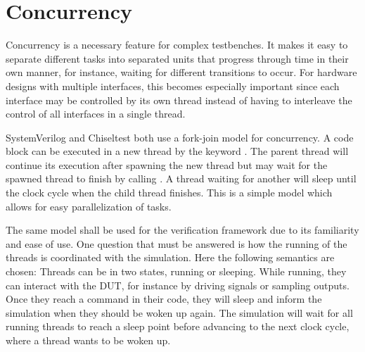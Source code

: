 \section{Concurrency} %

Concurrency is a necessary feature for complex testbenches. It makes it easy to separate different tasks into
separated units that progress through time in their own manner, for instance, waiting for different transitions to
occur. For hardware designs with multiple interfaces, this becomes especially important since each interface may be
controlled by its own thread instead of having to interleave the control of all interfaces in a single thread.

SystemVerilog and Chiseltest both use a fork-join model for concurrency. A code block can be executed in a new thread
by the keyword . The parent thread will continue its execution after spawning the new thread but may wait
for the spawned thread to finish by calling . A thread waiting for another will sleep until the clock cycle
when the child thread finishes. This is a simple model which allows for easy parallelization of tasks.

The same model shall be used for the verification framework due to its familiarity and ease of use. One question
that must be answered is how the running of the threads is coordinated with the simulation. Here the following
semantics are chosen: Threads can be in two states, running or sleeping. While running, they can interact with the
DUT, for instance by driving signals or sampling outputs. Once they reach a  command in their code, they
will sleep and inform the simulation when they should be woken up again. The simulation will wait for all running
threads to reach a sleep point before advancing to the next clock cycle, where a thread wants to be woken up.

